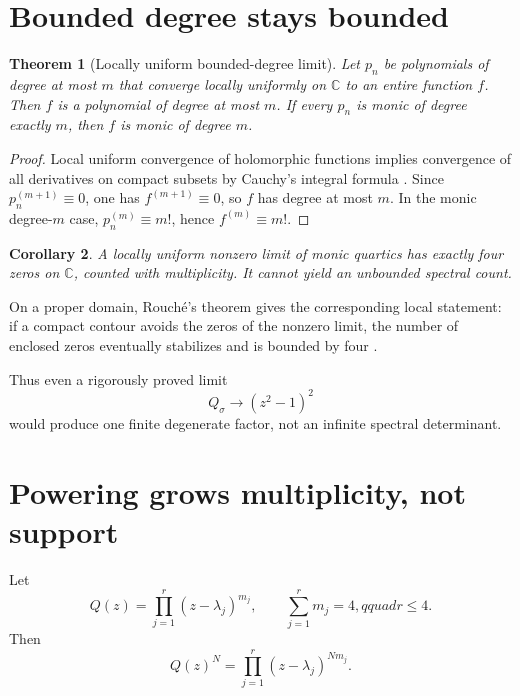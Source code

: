 \documentclass[12pt]{article}
\newtheorem{theorem}{Theorem}[section]\newtheorem{proposition}[theorem]{Proposition}
\newtheorem{corollary}[theorem]{Corollary}
\theoremstyle{remark}\newtheorem{remark}[theorem]{Remark}
\begin{document}
\section{Bounded degree stays bounded}

\begin{theorem}[Locally uniform bounded-degree limit]\label{thm:degree}
Let $p_n$ be polynomials of degree at most $m$ that converge locally uniformly
on $\mathbb C$ to an entire function $f$.  Then $f$ is a polynomial of degree
at most $m$.  If every $p_n$ is monic of degree exactly $m$, then $f$ is monic
of degree $m$.
\end{theorem}
\begin{proof}
Local uniform convergence of holomorphic functions implies convergence of all
derivatives on compact subsets by Cauchy's integral formula
\citep{Conway1978}.  Since $p_n^{(m+1)}\equiv0$, one has
$f^{(m+1)}\equiv0$, so $f$ has degree at most $m$.  In the monic degree-$m$
case, $p_n^{(m)}\equiv m!$, hence $f^{(m)}\equiv m!$.
\end{proof}

\begin{corollary}\label{cor:four}
A locally uniform nonzero limit of monic quartics has exactly four zeros on
$\mathbb C$, counted with multiplicity.  It cannot yield an unbounded
spectral count.
\end{corollary}

On a proper domain, Rouch\'e's theorem gives the corresponding local
statement: if a compact contour avoids the zeros of the nonzero limit, the
number of enclosed zeros eventually stabilizes and is bounded by four
\citep{Conway1978}.

Thus even a rigorously proved limit
\begin{equation}
 Q_{\sigma}\longrightarrow(z^2-1)^2
\end{equation}
would produce one finite degenerate factor, not an infinite spectral
determinant.

\section{Powering grows multiplicity, not support}

Let
\begin{equation}
 Q(z)=\prod_{j=1}^{r}(z-\lambda_j)^{m_j},
 \qquad \sum_{j=1}^{r}m_j=4,qquad r\le4.
\end{equation}
Then
\begin{equation}\label{eq:powerdivisor}
 Q(z)^N=\prod_{j=1}^{r}(z-\lambda_j)^{Nm_j}.
\end{equation}
\end{document}
